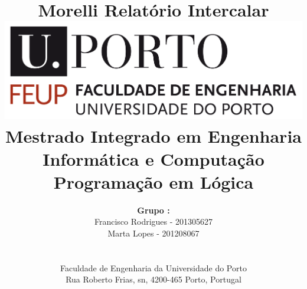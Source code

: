 \documentclass[a4paper]{article}
\begin{document}
\setlength{\textwidth}{16cm}
\setlength{\textheight}{22cm}

\title{\Huge\textbf{Morelli}\linebreak\linebreak\linebreak
\Large\textbf{Relatório Intercalar}\linebreak\linebreak
\linebreak\linebreak
\includegraphics[scale=0.1]{feup-logo.png}\linebreak\linebreak
\linebreak\linebreak
\Large{Mestrado Integrado em Engenharia Informática e Computação} \linebreak\linebreak
\Large{Programação em Lógica}\linebreak
}

\author{\textbf{Grupo :}\\
Francisco Rodrigues - 201305627 \\
Marta Lopes - 201208067 \\
\linebreak\linebreak \\
 \\ Faculdade de Engenharia da Universidade do Porto \\ Rua Roberto Frias, s\/n, 4200-465 Porto, Portugal \linebreak\linebreak\linebreak
\linebreak\linebreak\vspace{1cm}}

\maketitle
\end{document}
